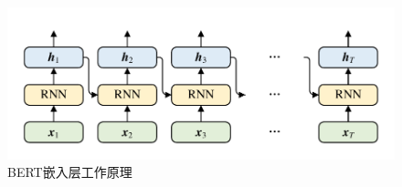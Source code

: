 \begin{figure}[htb]
	\centering
	\includegraphics[page=10, width=0.75\linewidth]{images/structure.pdf}
	\caption{BERT嵌入层工作原理}
	\label{fig:BERTinput}
\end{figure}